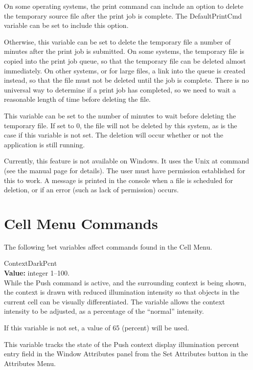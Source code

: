 \begin{description}
On some operating systems, the print command can include an option to
delete the temporary source file after the print job is complete.  The
{\et DefaultPrintCmd} variable can be set to include this option.

Otherwise, this variable can be set to delete the temporary file a
number of minutes after the print job is submitted.  On some systems,
the temporary file is copied into the print job queue, so that the
temporary file can be deleted almost immediately.  On other systems,
or for large files, a link into the queue is created instead, so that
the file must not be deleted until the job is complete.  There is no
universal way to determine if a print job has completed, so we need to
wait a reasonable length of time before deleting the file.

This variable can be set to the number of minutes to wait before
deleting the temporary file.  If set to 0, the file will not be
deleted by this system, as is the case if this variable is not set. 
The deletion will occur whether or not the application is still
running.

Currently, this feature is not available on Windows.  It uses the Unix
{\vt at} command (see the manual page for details).  The user must
have permission established for this to work.  A message is printed in
the console when a file is scheduled for deletion, or if an error
(such as lack of permission) occurs.
\end{description}


\section{Cell Menu Commands}

The following {\cb !set} variables affect commands found in the
{\cb Cell Menu}.

\begin{description}
\item{\et ContextDarkPcnt}\\
{\bf Value:} integer 1--100.\\
While the {\cb Push} command is active, and the surrounding context is
being shown, the context is drawn with reduced illumination intensity
so that objects in the current cell can be visually differentiated. 
The variable allows the context intensity to be adjusted, as a
percentage of the ``normal'' intensity.

If this variable is not set, a value of 65 (percent) will be used.
       
This variable tracks the state of the {\cb Push context display
illumination percent} entry field in the {\cb Window Attributes} panel
from the {\cb Set Attributes} button in the {\cb Attributes Menu}.
\end{description}


